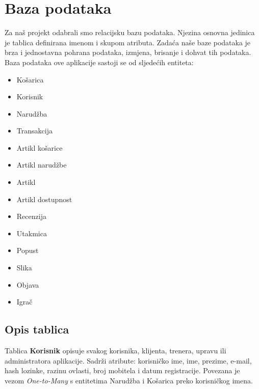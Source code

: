 	
		

		

				
		\section{Baza podataka}
			
			
		\textnormal{Za naš projekt odabrali smo relacijsku bazu podataka. Njezina osnovna jedinica je tablica definirana imenom i skupom atributa. Zadaća naše baze podataka je brza i jednostavna pohrana podataka, izmjena, brisanje i dohvat tih podataka. Baza podataka ove aplikacije sastoji se od sljedećih entiteta:}
		\bigbreak
			\begin{itemize}
			\item  Košarica
			\item  Korisnik
			\item  Narudžba
			\item Transakcija
			\item Artikl košarice
			\item Artikl narudžbe
			\item Artikl
			\item Artikl dostupnost
			\item Recenzija
			\item Utakmica
			\item Popust
			\item Slika
			\item Objava
			\item Igrač
		\end{itemize}
		
		
			\subsection{Opis tablica}
			

				\textnormal{Tablica \textbf{Korisnik} opisuje svakog korisnika, klijenta, trenera, upravu ili administratora aplikacije. Sadrži atribute: korisničko ime, ime, prezime, e-mail, hash lozinke, razinu ovlasti, broj mobitela i datum registracije. Povezana je vezom \textit{One-to-Many}  s entitetima Narudžba i Košarica preko korisničkog imena. }
				
